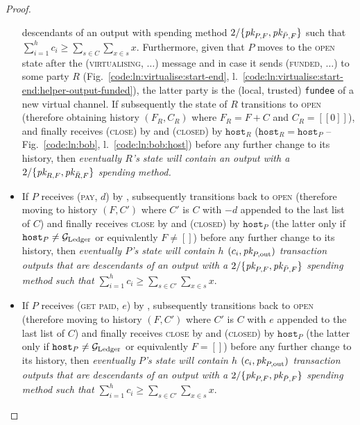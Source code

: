 \begin{proof}
\begin{itemize}
{    descendants of an output with spending method $2/\{\textit{pk}_{P, F}, \textit{pk}_{\bar{P},
    F}\}$ such that $\sum\limits_{i=1}^h c_i \geq \sum\limits_{s \in C}
    \sum\limits_{x \in s} x$}. Furthermore, given that $P$ moves to the
    \textsc{open} state after the (\textsc{virtualising}, $\dots$) message and
    in case it sends (\textsc{funded}, $\dots$) to some party $R$
    (Fig.~\ref{code:ln:virtualise:start-end},
    l.~\ref{code:ln:virtualise:start-end:helper-output-funded}), the latter
    party is the (local, trusted) \texttt{fundee} of a new virtual channel. If
    subsequently the state of $R$ transitions to \textsc{open} (therefore
    obtaining history $(F_R, C_R)$ where $F_R = F + C$ and $C_R = [[0]]$), and
    finally receives (\textsc{close}) by \environment and (\textsc{closed}) by
    $\texttt{host}_R$ ($\texttt{host}_R = \texttt{host}_P$ --
    Fig.~\ref{code:ln:bob}, l.~\ref{code:ln:bob:host}) before any further change
    to its history, then \emph{eventually $R$'s \ledger state will contain an
    output with a $2/\{\textit{pk}_{R, F}, \textit{pk}_{\bar{R}, F}\}$ spending method.}
    \item If $P$ receives (\textsc{pay}, $d$) by \environment, subsequently
    transitions back to \textsc{open} (therefore moving to history $(F, C')$
    where $C'$ is $C$ with $-d$ appended to the last list of $C$) and finally
    receives \textsc{close} by \environment and (\textsc{closed}) by
    $\texttt{host}_P$ (the latter only if $\texttt{host}_P \neq \mathcal{G}_{\mathrm{Ledger}}$ or
    equivalently $F \neq []$) before any further change to its history, then
    \emph{eventually $P$'s \ledger state will contain $h$ $(c_i, \textit{pk}_{P,
    \mathrm{out}})$ transaction outputs that are descendants of an output with a
    $2/\{\textit{pk}_{P, F}, \textit{pk}_{\bar{P}, F}\}$ spending method such that
    $\sum\limits_{i=1}^h c_i \geq \sum\limits_{s \in C'} \sum\limits_{x \in s}
    x$}.
    \item If $P$ receives (\textsc{get paid}, $e$) by \environment, subsequently
    transitions back to \textsc{open} (therefore moving to history $(F, C')$
    where $C'$ is $C$ with $e$ appended to the last list of $C$) and finally
    receives \textsc{close} by \environment and (\textsc{closed}) by
    $\texttt{host}_P$ (the latter only if $\texttt{host}_P \neq \mathcal{G}_{\mathrm{Ledger}}$ or
    equivalently $F = []$) before any further change to its history, then
    \emph{eventually $P$'s \ledger state will contain $h$ $(c_i, \textit{pk}_{P,
    \mathrm{out}})$ transaction outputs that are descendants of an output with a
    $2/\{\textit{pk}_{P, F}, \textit{pk}_{\bar{P}, F}\}$ spending method such that
    $\sum\limits_{i=1}^h c_i \geq \sum\limits_{s \in C'} \sum\limits_{x \in s}
    x$}.
  \end{itemize}


\end{proof}
